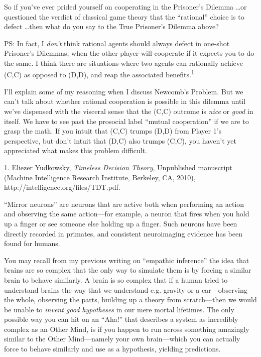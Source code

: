 {
 So if you've ever prided yourself on cooperating
in the Prisoner's Dilemma \ldots or questioned the
verdict of classical game theory that the
``rational'' choice is to defect
\ldots then what do you say to the True Prisoner's
Dilemma above?}

{
 PS: In fact, I \textit{don't} think rational
agents should always defect in one-shot Prisoner's
Dilemmas, when the other player will cooperate if it expects you to do
the same. I think there are situations where two agents can rationally
achieve (C,C) as opposed to (D,D), and reap the associated
benefits.\textsuperscript{1}}

{
 I'll explain some of my reasoning when I discuss
Newcomb's Problem. But we can't talk
about whether rational cooperation is possible in this dilemma until
we've dispensed with the visceral sense that the (C,C)
outcome is \textit{nice} or \textit{good} in itself. We have to see
past the prosocial label ``mutual
cooperation'' if we are to grasp the math. If you
intuit that (C,C) trumps (D,D) from Player 1's
perspective, but don't intuit that (D,C) also trumps
(C,C), you haven't yet appreciated what makes this
problem difficult.}

\myendsectiontext


\bigskip

{
 1. Eliezer Yudkowsky, \textit{Timeless Decision Theory},
Unpublished manuscript (Machine Intelligence Research Institute,
Berkeley, CA, 2010), http://intelligence.org/files/TDT.pdf.}


{
 ``Mirror neurons'' are neurons
that are active both when performing an action and observing the same
action---for example, a neuron that fires when you hold up a finger or
see someone else holding up a finger. Such neurons have been directly
recorded in primates, and consistent neuroimaging evidence has been
found for humans. }

{
 You may recall from my previous writing on
``empathic inference'' the idea that
brains are so complex that the only way to simulate them is by forcing
a similar brain to behave similarly. A brain is so complex that if a
human tried to understand brains the way that we understand e.g.
gravity or a car---observing the whole, observing the parts, building
up a theory from scratch---then we would be unable to \textit{invent
good hypotheses} in our mere mortal lifetimes. The only possible way
you can hit on an ``Aha!'' that
describes a system as incredibly complex as an Other Mind, is if you
happen to run across something amazingly similar to the Other
Mind---namely your own brain---which you can actually force to behave
similarly and use as a hypothesis, yielding predictions.}

